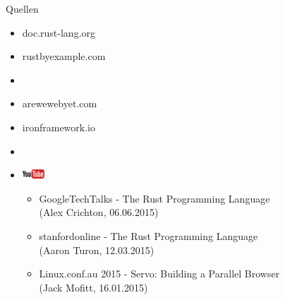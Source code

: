 \documentclass{beamer}
\begin{document}
\begin{frame}{Quellen}
	\begin{itemize}
	  \item doc.rust-lang.org
	  \item rustbyexample.com
	  \item[]
	  \item arewewebyet.com
	  \item ironframework.io
	  \item[]
	  \item[] \includegraphics[height=3.5mm]{youtube_logo.eps}
	  	\begin{itemize}
	  	\item GoogleTechTalks - The Rust Programming Language \\ (Alex Crichton, 06.06.2015)
	  	\item stanfordonline - The Rust Programming Language  \\ (Aaron Turon, 12.03.2015)
	  	\item Linux.conf.au 2015 - Servo: Building a Parallel Browser \\ (Jack Mofitt, 16.01.2015)
	  	\end{itemize}
	\end{itemize}
\end{frame}
\end{document}
